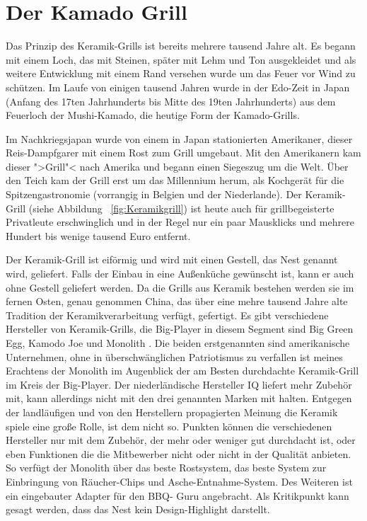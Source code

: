 	\newpage

\section{Der Kamado Grill}

	Das Prinzip des Keramik-Grills ist bereits mehrere tausend Jahre alt. Es begann 
	mit einem Loch, das 
	mit Steinen, später mit Lehm und Ton ausgekleidet und als weitere Entwicklung 
	mit 
	einem Rand versehen wurde um das Feuer vor Wind zu schützen. 
	Im Laufe von einigen tausend Jahren wurde in der Edo-Zeit in Japan (Anfang 
	des 17ten Jahrhunderts 
	bis Mitte des 19ten Jahrhunderts) aus dem Feuerloch der Mushi-Kamado, die 
	heutige Form
	der Kamado-Grills.
	
	Im Nachkriegsjapan wurde von einem in Japan stationierten Amerikaner, dieser 
	Reis-Dampfgarer mit 
	einem Rost zum Grill umgebaut. Mit den Amerikanern kam dieser ">Grill"< nach 
	Amerika und begann 
	einen Siegeszug um die Welt. Über den Teich kam der Grill erst um das 
	Millennium herum, als 
	Kochgerät für die Spitzengastronomie (vorrangig in Belgien und der 
	Niederlande). Der Keramik-Grill (siehe Abbildung ~\vref{fig:Keramikgrill}) ist heute
	auch für grillbegeisterte Privatleute erschwinglich und in der Regel nur ein paar 
	Mausklicks und 
	mehrere Hundert bis wenige tausend Euro entfernt.
	
	Der Keramik-Grill ist eiförmig und wird mit einen Gestell, das Nest genannt 
	wird, geliefert. Falls der 
	Einbau in eine Außenküche gewünscht ist, kann er auch ohne Gestell geliefert 
	werden.
	Da die Grills aus Keramik bestehen werden sie im fernen Osten, genau 
	genommen China, das über 
	eine mehre tausend Jahre alte Tradition der Keramikverarbeitung verfügt, 
	gefertigt. Es gibt 
	verschiedene Hersteller von Keramik-Grills, die Big-Player in diesem Segment 
	sind Big Green Egg, 
	Kamodo Joe und Monolith . Die beiden erstgenannten sind amerikanische 
	Unternehmen, ohne in 
	überschwänglichen Patriotismus zu verfallen ist meines Erachtens der Monolith 
	im Augenblick der am 
	Besten durchdachte Keramik-Grill im Kreis der Big-Player. Der niederländische 
	Hersteller IQ liefert 
	mehr Zubehör mit, kann allerdings nicht mit den drei genannten Marken mit 
	halten. Entgegen der 
	landläufigen und von den Herstellern propagierten Meinung die Keramik spiele 
	eine große Rolle, ist 
	dem nicht so. Punkten können die verschiedenen Hersteller nur mit dem 
	Zubehör, der mehr oder 
	weniger gut durchdacht ist, oder eben Funktionen die die Mitbewerber nicht 
	oder nicht in der Qualität 
	anbieten. So verfügt der Monolith über das beste Rostsystem, das beste 
	System zur Einbringung von 
	Räucher-Chips und Asche-Entnahme-System. Des Weiteren ist ein eingebauter 
	Adapter für den BBQ-
	Guru angebracht. Als Kritikpunkt kann gesagt werden, dass das Nest kein 
	Design-Highlight darstellt.
 
